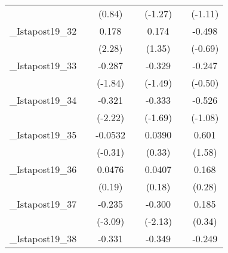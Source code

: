 {\begin{tabular}{l*{6}{c}}
            &                     &      (0.84)         &                     &     (-1.27)         &                     &     (-1.11)         \\
[1em]
\_Istapost19\_32&                     &       0.178\sym{*}  &                     &       0.174         &                     &      -0.498         \\
            &                     &      (2.28)         &                     &      (1.35)         &                     &     (-0.69)         \\
[1em]
\_Istapost19\_33&                     &      -0.287         &                     &      -0.329         &                     &      -0.247         \\
            &                     &     (-1.84)         &                     &     (-1.49)         &                     &     (-0.50)         \\
[1em]
\_Istapost19\_34&                     &      -0.321\sym{*}  &                     &      -0.333         &                     &      -0.526         \\
            &                     &     (-2.22)         &                     &     (-1.69)         &                     &     (-1.08)         \\
[1em]
\_Istapost19\_35&                     &     -0.0532         &                     &      0.0390         &                     &       0.601         \\
            &                     &     (-0.31)         &                     &      (0.33)         &                     &      (1.58)         \\
[1em]
\_Istapost19\_36&                     &      0.0476         &                     &      0.0407         &                     &       0.168         \\
            &                     &      (0.19)         &                     &      (0.18)         &                     &      (0.28)         \\
[1em]
\_Istapost19\_37&                     &      -0.235\sym{**} &                     &      -0.300\sym{*}  &                     &       0.185         \\
            &                     &     (-3.09)         &                     &     (-2.13)         &                     &      (0.34)         \\
[1em]
\_Istapost19\_38&                     &      -0.331\sym{***}&                     &      -0.349\sym{**} &                     &      -0.249         \\

\end{tabular}}

